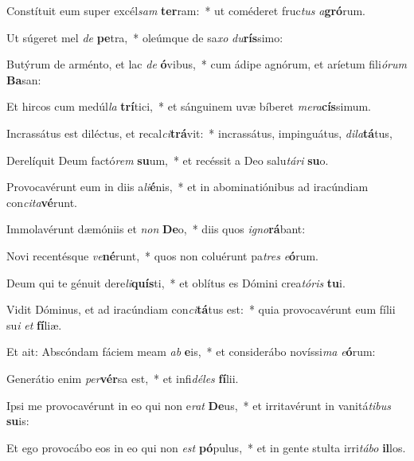 \item Constítuit eum super excél\textit{sam} \textbf{ter}ram:~* ut coméderet fruc\textit{tus} \textit{a}\textbf{gró}rum.
\item Ut súgeret mel \textit{de} \textbf{pe}tra,~* oleúmque de sa\textit{xo} \textit{du}\textbf{rís}simo:
\item Butýrum de arménto, et lac \textit{de} \textbf{ó}vibus,~* cum ádipe agnórum, et aríetum fili\textit{ó}\textit{rum} \textbf{Ba}san:
\item Et hircos cum medúl\textit{la} \textbf{trí}tici,~* et sánguinem uvæ bíberet \textit{me}\textit{ra}\textbf{cís}simum.
\item Incrassátus est diléctus, et recal\textit{ci}\textbf{trá}vit:~* incrassátus, impinguátus, \textit{di}\textit{la}\textbf{tá}tus,
\item Derelíquit Deum factó\textit{rem} \textbf{su}um,~* et recéssit a Deo salu\textit{tá}\textit{ri} \textbf{su}o.
\item Provocavérunt eum in diis a\textit{li}\textbf{é}nis,~* et in abominatiónibus ad iracúndiam con\textit{ci}\textit{ta}\textbf{vé}runt.
\item Immolavérunt dæmóniis et \textit{non} \textbf{De}o,~* diis quos \textit{i}\textit{gno}\textbf{rá}bant:
\item Novi recentésque \textit{ve}\textbf{né}runt,~* quos non coluérunt pa\textit{tres} \textit{e}\textbf{ó}rum.
\item Deum qui te génuit dere\textit{li}\textbf{quís}ti,~* et oblítus es Dómini crea\textit{tó}\textit{ris} \textbf{tu}i.
\item Vidit Dóminus, et ad iracúndiam con\textit{ci}\textbf{tá}tus est:~* quia provocavérunt eum fílii su\textit{i} \textit{et} \textbf{fí}liæ.
\item Et ait: Abscóndam fáciem meam \textit{ab} \textbf{e}is,~* et considerábo novíssi\textit{ma} \textit{e}\textbf{ó}rum:
\item Generátio enim \textit{per}\textbf{vér}sa est,~* et infi\textit{dé}\textit{les} \textbf{fí}lii.
\item Ipsi me provocavérunt in eo qui non e\textit{rat} \textbf{De}us,~* et irritavérunt in vanitá\textit{ti}\textit{bus} \textbf{su}is:
\item Et ego provocábo eos in eo qui non \textit{est} \textbf{pó}pulus,~* et in gente stulta irri\textit{tá}\textit{bo} \textbf{il}los.
